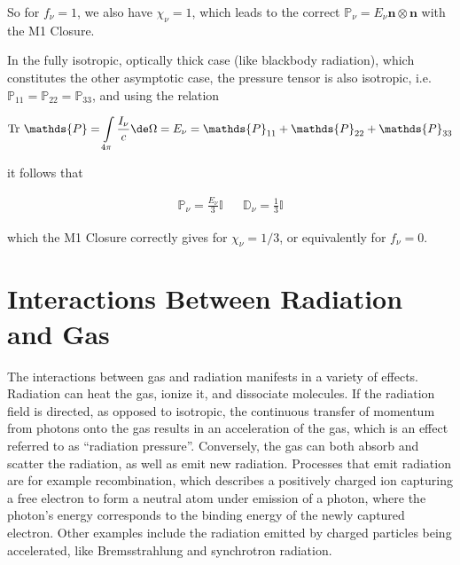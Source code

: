 So for $f_\nu = 1$, we also have $\chi_\nu = 1$, which leads to the correct $\mathds{P}_\nu = E_\nu
\mathbf{n} \otimes \mathbf{n}$ with the M1 Closure.

In the fully isotropic, optically thick case (like blackbody radiation), which constitutes the other
asymptotic case, the pressure tensor is also isotropic, i.e. $\mathds{P}_{11} = \mathds{P}_{22} =
\mathds{P}_{33}$, and using the relation

\begin{align}
	\mathrm{Tr}\ \mathds{P} = \int\limits_{4 \pi} \frac{I_\nu}{c} \de \Omega = E_\nu =
\mathds{P}_{11} + \mathds{P}_{22} + \mathds{P}_{33}
\end{align}

it follows that

\begin{align}
	\mathds{P}_\nu = \frac{E_\nu}{3} \mathds{I} && \mathds{D}_\nu = \frac{1}{3} \mathds{I}
\end{align}

which the M1 Closure correctly gives for $\chi_\nu = 1/3$, or equivalently for $f_\nu = 0$.










\section{Interactions Between Radiation and Gas}\label{chap:coupling-to-hydrodynamics}


The interactions between gas and radiation manifests in a variety of effects. Radiation can heat
the gas, ionize it, and dissociate molecules. If the radiation field is directed, as opposed to
isotropic, the continuous transfer of momentum from photons onto the gas results in an acceleration
of the gas, which is an effect referred to as ``radiation pressure''. Conversely, the gas can both
absorb and scatter the radiation, as well as emit new radiation. Processes that emit radiation are
for example recombination, which describes a positively charged ion capturing a free electron to
form a neutral atom under emission of a photon, where the photon's energy corresponds to the binding
energy of the newly captured electron. Other examples include the radiation emitted by charged
particles being accelerated, like Bremsstrahlung and synchrotron radiation.

